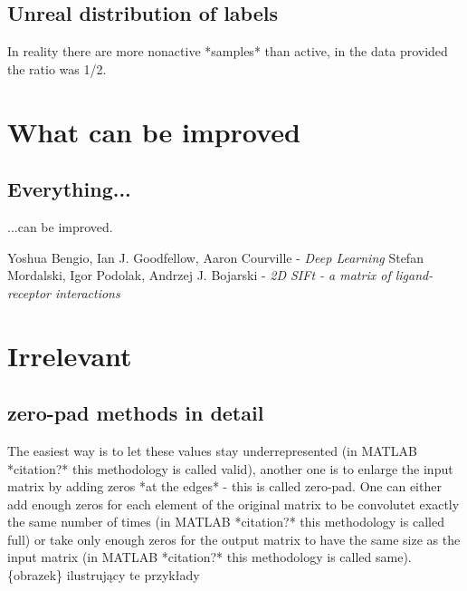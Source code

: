\documentclass[a4paper,10pt]{report}
\begin{document}
      \section{Unreal distribution of labels}
      In reality there are more nonactive *samples* than active, in the data provided the ratio was 1/2.
	
  \chapter{What can be improved} %
    \section{Everything...}
      ...can be improved.\\

  \begin{thebibliography}{99}
      Yoshua Bengio, Ian J. Goodfellow, Aaron Courville - \emph{Deep Learning}
      Stefan Mordalski, Igor Podolak, Andrzej J. Bojarski - \emph{2D SIFt - a matrix of ligand-receptor interactions}
    
  \end{thebibliography}
  
  \chapter{Irrelevant} %
    \section{zero-pad methods in detail}
      The easiest way is to let these values stay underrepresented (in MATLAB *citation?* this methodology is called valid), another one is to enlarge the input matrix by adding zeros *at the edges* - this is called zero-pad. One can either add enough zeros for each element of the original matrix to be convolutet exactly the same number of times (in MATLAB *citation?* this methodology is called full) or take only enough zeros for the output matrix to have the same size as the input matrix (in MATLAB *citation?* this methodology is called same).\\
	  
      \{obrazek\} ilustrujący te przykłady \\
	  
\end{document}
